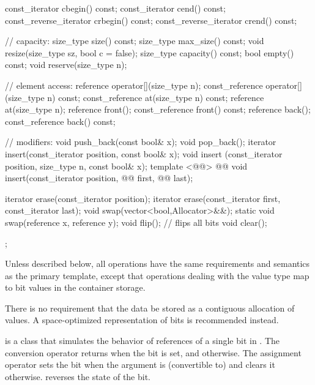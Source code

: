 \documentclass[american,twoside]{book}
\begin{document}
\begin{codeblock}
{{    const_iterator         cbegin() const;
    const_iterator         cend() const;
    const_reverse_iterator crbegin() const;
    const_reverse_iterator crend() const;

    // capacity:
    size_type size() const;
    size_type max_size() const;
    void      resize(size_type sz, bool c = false);
    size_type capacity() const;
    bool      empty() const;
    void      reserve(size_type n);

    // element access:
    reference       operator[](size_type n);
    const_reference operator[](size_type n) const;
    const_reference at(size_type n) const;
    reference       at(size_type n);
    reference       front();
    const_reference front() const;
    reference       back();
    const_reference back() const;

    // modifiers:
    void push_back(const bool& x);
    void pop_back();
    iterator insert(const_iterator position, const bool& x);
    void     insert (const_iterator position, size_type n, const bool& x);
    template <@@>
        @@
        void insert(const_iterator position,
                    @@ first, @@ last);

    iterator erase(const_iterator position);
    iterator erase(const_iterator first, const_iterator last);
    void swap(vector<bool,Allocator>&&);
    static void swap(reference x, reference y);
    void flip();                // flips all bits
    void clear();
  };

}
\end{codeblock}%

\pnum
Unless described below, all operations have the same requirements and
semantics as the primary  template, except that operations
dealing with the  value type map to bit values in the
container storage.

\pnum
There is no requirement that the data be stored as a contiguous allocation
of  values. A space-optimized representation of bits is
recommended instead.

\pnum
{}
is a class that simulates the behavior of references of a single bit in
. The conversion operator returns 
when the bit is set, and  otherwise. The assignment operator
sets the bit when the argument is (convertible to)  and
clears it otherwise.  reverses the state of the bit.
\end{document}

